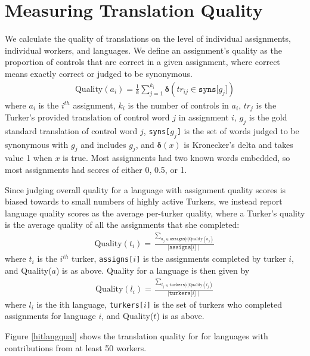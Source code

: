 \documentclass[11pt]{article}
\begin{document}
\section{Measuring Translation Quality}

We calculate the quality of translations on the level of individual assignments, individual workers, and languages.  We define an assignment's quality as the proportion of controls that are correct in a given assignment, where correct means exactly correct or judged to be synonymous.
\begin{align}	
	\text{Quality}(a_i) = \frac{1}{k}\sum\limits_{j=1}^{k_i}\mathbf{\delta}(tr_{ij} \in \texttt{syns[$g_j$]})
\end{align}	
where $a_i$ is the $i^{th}$ assignment, $k_i$ is the number of controls in $a_i$, $tr_j$ is the Turker's provided translation of control word $j$ in assignment $i$, $g_j$ is the gold standard translation of control word $j$, \texttt{syns[$g_j$]} is the set of words judged to be synonymous with $g_j$ and includes $g_j$, and $\mathbf{\delta}(x)$ is Kronecker's delta and takes value 1 when $x$ is true. 
Most assignments had two known words embedded, so most assignments had scores of either 0, 0.5, or 1. 

Since judging overall quality for a language with assignment quality scores is biased towards to small numbers of highly active Turkers, we instead report language quality scores as the average per-turker quality, where a Turker's quality is  the average quality of all the assignments that she completed:
\begin{align}	
	\text{Quality}(t_i) = \frac{\sum_{a_j \in \texttt{assigns[$i$]}\text{Quality}(a_j)}}{\mid \texttt{assigns[$i$]} \mid}
\end{align}	
where $t_i$ is the $i^{th}$ turker, \texttt{assigns[$i$]} is the assignments completed by turker $i$, and Quality($a$) is as above.
%
Quality for a language is then given by
\begin{align}	
	\text{Quality}(l_i) = \frac{\sum_{t_j \in \texttt{turkers[$i$]}\text{Quality}(t_j)}}{\mid \texttt{turkers[$i$]} \mid}
\end{align}	
where $l_i$ is the ith language, \texttt{turkers[$i$]} is the set of turkers who completed assignments for language $i$, and Quality($t$) is as above.


Figure \ref{hitlangqual} shows the translation quality for for languages with contributions from at least 50 workers.  
\end{document}
